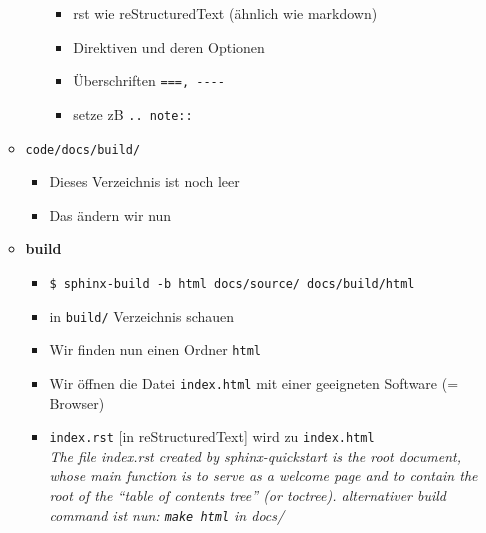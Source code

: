 \begin{itemize}
\begin{itemize}
\begin{itemize}
\begin{itemize}
				                  \item
				                        rst wie reStructuredText (ähnlich wie markdown)
				                  \item
				                        Direktiven und deren Optionen
				                  \item
				                        Überschriften \texttt{===,\ -\/-\/-\/-}
				                  \item
				                        setze zB \texttt{..\ note::}
			                  \end{itemize}
		            \end{itemize}
		      \item
		            \texttt{code/docs/build/}
		            \begin{itemize}
			            \item Dieses Verzeichnis ist noch leer
			            \item Das ändern wir nun
		            \end{itemize}
		      \item
		            \textbf{build}

		            \begin{itemize}

			            \item
			                  \texttt{\$ sphinx-build\ -b\ html\ docs/source/\ docs/build/html}
			            \item
			                  in \texttt{build/} Verzeichnis schauen
			            \item
			                  Wir finden nun einen Ordner \texttt{html}
			            \item
			                  Wir öffnen die Datei \texttt{index.html} mit einer geeigneten
			                  Software (= Browser)
			            \item
			                  \texttt{index.rst} {[}in reStructuredText{]} wird zu \texttt{index.html}\\
			                  \textit{			The file index.rst created by sphinx-quickstart is the root
				                  document, whose main function is to serve as a welcome page and to
				                  contain the root of the ``table of contents tree'' (or toctree).
				                  alternativer build command ist nun: \texttt{make\ html} in docs/}
		            \end{itemize}
	      \end{itemize}


\end{itemize}
